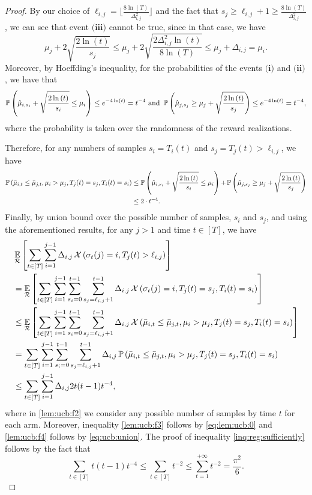 \begin{proof}
By our choice of $\ell_{i,j} = \bigg\lfloor \frac{8 \ln(T)}{\Delta^2_{i,j}}\bigg\rfloor$ and the fact that $s_j \geq \ell_{i,j} + 1 \geq \frac{8 \ln(T)}{\Delta^2_{i,j}}$, we can see that event $\textbf{(iii)}$ cannot be true, since in that case, we have
$$
 \mu_j + 2 \sqrt{\frac{2 \ln{(t)}}{s_j}}  \leq \mu_j + 2 \sqrt{\frac{2 \Delta^2_{i,j}\ln{(t)}}{8 \ln(T)}} \leq \mu_j + \Delta_{i,j} = \mu_i.
$$
Moreover, by Hoeffding's inequality, for the probabilities of the events $\textbf{(i)}$ and $\textbf{(ii)}$, we have that
$$
\mathop{\mathbb{P}\left(\hat{\mu}_{i,s_{i}} + \sqrt{\frac{2 \ln{(t)}}{s_i}} \leq \mu_i\right)} \leq e^{-4 \ln(t)} = t^{-4}\text{   and   }\mathop{\mathbb{P}\left(\hat{\mu}_{j,s_{j}} \geq \mu_j + \sqrt{\frac{2 \ln{(t)}}{s_{j}}}\right)} \leq e^{-4 \ln(t)} = t^{-4},
$$
where the probability is taken over the randomness of the reward realizations.

Therefore, for any numbers of samples $s_i = T_i(t)$ and $s_j = T_j(t) > \ell_{i,j}$, we have
\begin{align}
    \mathop{\mathbb{P}\left(\bar{\mu}_{i,t} \leq \bar{\mu}_{j,t},\mu_i > \mu_j, T_j(t) = s_j, T_i(t)= s_i\right)} 
    &\leq \mathop{\mathbb{P}\left(\hat{\mu}_{i,s_{i}} + \sqrt{\frac{2 \ln{(t)}}{s_i}} \leq \mu_i\right)} + \mathop{\mathbb{P}\left(\hat{\mu}_{j,s_{j}} \geq \mu_j + \sqrt{\frac{2 \ln{(t)}}{s_{j}}}\right)} \notag\\
    &\leq 2\cdot t^{-4}  \label{eq:ucb:union}.
\end{align}
Finally, by union bound over the possible number of samples, $s_i$ and $s_j$, and using the aforementioned results, for any $j > 1$ and time $t \in [T]$, we have
\begin{align}
    &\mathop{\underset{\mathcal{R}}{\mathbb{E}}\left[\sum_{t \in [T]} \sum^{j-1}_{i = 1} \Delta_{i , j} \mathop{\mathcal{X}\left(\sigma_t(j)=i, T_j(t) > \ell_{i,j}\right)}\right]} \notag\\
    &= \mathop{\underset{\mathcal{R}}{\mathbb{E}}\left[\sum_{t \in [T]} \sum^{j-1}_{i = 1} \sum^{t-1}_{s_i = 0} \sum^{t-1}_{s_j = \ell_{i,j}+1} \Delta_{i , j} \mathop{\mathcal{X}\left(\sigma_t(j)=i, T_j(t) = s_j, T_i(t)= s_i\right)}\right]}\label{lem:ucb:f2}\\
    &\leq \mathop{\underset{\mathcal{R}}{\mathbb{E}}\left[\sum_{t \in [T]} \sum^{j-1}_{i = 1} \sum^{t-1}_{s_i = 0} \sum^{t-1}_{s_j = \ell_{i,j}+1} \Delta_{i , j} \mathop{\mathcal{X}\left(\bar{\mu}_{i,t} \leq \bar{\mu}_{j,t},\mu_i > \mu_j, T_j(t) = s_j, T_i(t)= s_i\right)}\right]}\label{lem:ucb:f3}\\
    &= \sum_{t \in [T]} \sum^{j-1}_{i = 1} \sum^{t-1}_{s_i = 0} \sum^{t-1}_{s_j = \ell_{i,j}+1} \Delta_{i , j} \mathop{\mathbb{P}\left(\bar{\mu}_{i,t} \leq \bar{\mu}_{j,t},\mu_i > \mu_j, T_j(t) = s_j, T_i(t)= s_i\right)}\notag\\
    &\leq  \sum_{t \in [T]} \sum^{j-1}_{i = 1} \Delta_{i , j} 2 t(t-1) t^{-4}  \label{lem:ucb:f4},
\end{align}
where in \eqref{lem:ucb:f2} we consider any possible number of samples by time $t$ for each arm. Moreover, inequality \eqref{lem:ucb:f3} follows by \eqref{eq:lem:ucb:0} and \eqref{lem:ucb:f4} follows by \eqref{eq:ucb:union}.
The proof of inequality \eqref{inq:reg:sufficiently} follows by the fact that 
$$\sum_{t \in [T]} t(t-1)t^{-4} \leq \sum_{t \in [T]}t^{-2} \leq \sum^{+\infty}_{t =1}t^{-2} = \frac{\pi^2}{6}.$$
\end{proof}


